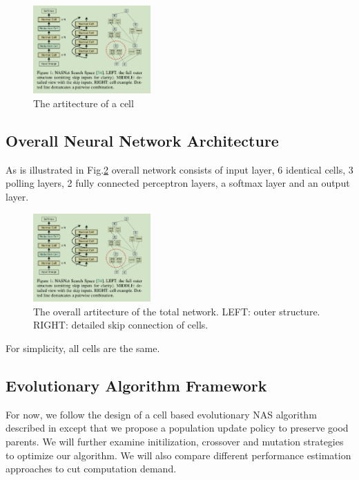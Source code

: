 \documentclass[conference]{IEEEtran}
\begin{document}
  \begin{figure}[H]
 	\centering
 	\includegraphics[width=0.4\textwidth]{figures/architecture.png}
   \caption{The artitecture of a cell}\label{fig:digit}
   \label{f_artc}
  \end{figure}

  \subsection{Overall Neural Network Architecture}
  As is illustrated in Fig.\ref{total_artc} overall network consists of input layer, 6 identical cells, 3 polling layers, 2 fully connected perceptron layers, a softmax layer and an output layer. 

  \begin{figure}[H]
 	\centering
 	\includegraphics[width=0.4\textwidth]{figures/architecture.png}
   \caption{The overall artitecture of the total network. LEFT: outer structure. RIGHT: detailed skip connection of cells.}\label{fig:digit}
   \label{total_artc}
  \end{figure}

  For simplicity, all cells are the same. 
  \subsection{Evolutionary Algorithm Framework}
  For now, we follow the design of a cell based evolutionary NAS algorithm described in\cite{DBLP:journals/corr/abs-1802-01548} except that we propose a population update policy to preserve good parents. We will further examine initilization, crossover and mutation strategies to optimize our algorithm. We will also compare different performance estimation approaches to cut computation demand.
\end{document}
